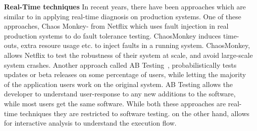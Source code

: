 \noindent
\textbf{Real-Time techniques}
In recent years, there have been approaches which are similar to \parikshan in applying real-time diagnosis on production systems.
One of these approaches, Chaos Monkey-\cite{chaosmonkey} from Netflix which uses fault injection in real production systems to do fault tolerance testing.
ChaosMonkey induces time-outs, extra resoure usage etc. to inject faults in a running system. 
ChaosMonkey, allows Netflix to test the robustness of their system at scale, and avoid large-scale system crashes.  
Another approach called AB Testing~\cite{abtesting}, probabilistically tests updates or beta releases on some percentage of users, while letting the majority of the application users work on the original system.
AB Testing allows the developer to understand user-response to any new additions to the software, while most users get the same software.
While both these approaches are real-time techniques they are restricted to software testing.
\parikshan on the other hand, allows for interactive analysis to understand the execution flow.
  
  
  